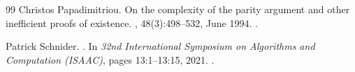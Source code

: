 \begin{thebibliography}{99}
Christos Papadimitriou.
\newblock On the complexity of the parity argument and other inefficient proofs
  of existence.
, 48(3):498--532, June
  1994.
\newblock \href {https://doi.org/10.1016/s0022-0000(05)80063-7}
  {}.

Patrick Schnider.
.
\newblock In {\em 32nd International Symposium on Algorithms and Computation
  (ISAAC)}, pages 13:1--13:15, 2021.
\newblock \href {https://doi.org/10.4230/LIPIcs.ISAAC.2021.13}
  {}.

\end{thebibliography}
